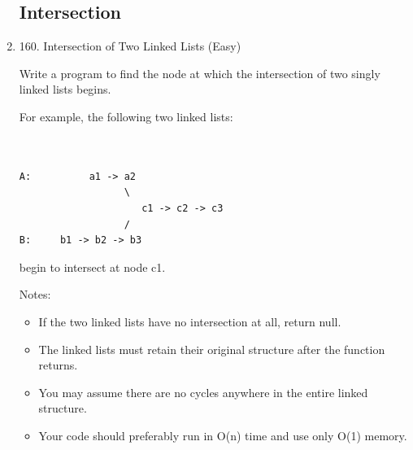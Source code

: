 \documentclass[../specific-algorithms.tex]{subfiles}
\begin{document}
\begin{enumerate}
\subsection{Intersection}
\item 160. Intersection of Two Linked Lists (Easy)

Write a program to find the node at which the intersection of two singly linked lists begins.

For example, the following two linked lists:
\begin{lstlisting}

        
A:          a1 -> a2
                  \
                     c1 -> c2 -> c3
                  /            
B:     b1 -> b2 -> b3
\end{lstlisting}

begin to intersect at node c1.

Notes:
\begin{itemize}
    \item If the two linked lists have no intersection at all, return null.
    \item The linked lists must retain their original structure after the function returns.
    \item You may assume there are no cycles anywhere in the entire linked structure.
    \item Your code should preferably run in O(n) time and use only O(1) memory.
\end{itemize}


\end{enumerate}
\end{document}
